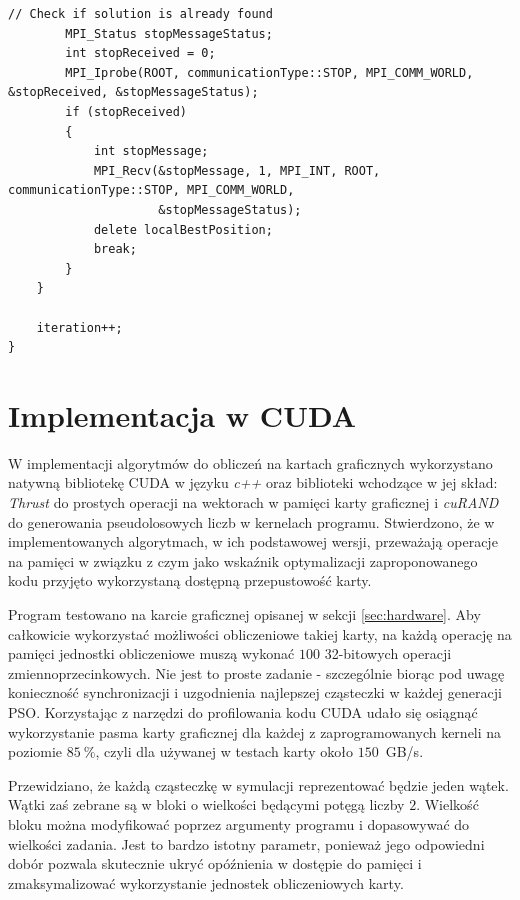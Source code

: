 \documentclass[11pt, a4paper, oneside]{article}
\begin{document}
\begin{lstlisting}[style=mycpp, label=code:pso_before, caption={Schemat komunikacji MPI w metodzie Monte Carlo.}]
        // Check if solution is already found
        MPI_Status stopMessageStatus;
        int stopReceived = 0;
        MPI_Iprobe(ROOT, communicationType::STOP, MPI_COMM_WORLD, &stopReceived, &stopMessageStatus);
        if (stopReceived)
        {
            int stopMessage;
            MPI_Recv(&stopMessage, 1, MPI_INT, ROOT, communicationType::STOP, MPI_COMM_WORLD,
                     &stopMessageStatus);
            delete localBestPosition;
            break;
        }
    }

    iteration++;
}
\end{lstlisting}
        
        
\section{Implementacja w CUDA}

W implementacji algorytmów do obliczeń na kartach graficznych wykorzystano natywną bibliotekę CUDA w języku \textit{c++} oraz biblioteki wchodzące w jej skład: \textit{Thrust} do prostych operacji na wektorach w pamięci karty graficznej i \textit{cuRAND} do generowania pseudolosowych liczb w kernelach programu. Stwierdzono, że w implementowanych algorytmach, w ich podstawowej wersji, przeważają operacje na pamięci w związku z czym jako wskaźnik optymalizacji zaproponowanego kodu przyjęto wykorzystaną dostępną przepustowość karty.

Program testowano na karcie graficznej opisanej w sekcji \ref{sec:hardware}. Aby całkowicie wykorzystać możliwości obliczeniowe takiej karty, na każdą operację na pamięci jednostki obliczeniowe muszą wykonać $100$ 32-bitowych operacji zmiennoprzecinkowych. Nie jest to proste zadanie - szczególnie biorąc pod uwagę konieczność synchronizacji i uzgodnienia najlepszej cząsteczki w każdej generacji PSO. Korzystając z narzędzi do profilowania kodu CUDA udało się osiągnąć wykorzystanie pasma karty graficznej dla każdej z zaprogramowanych kerneli na poziomie $85 \ \%$, czyli dla używanej w testach karty około $150$~GB/s.

Przewidziano, że każdą cząsteczkę w symulacji reprezentować będzie jeden wątek. Wątki zaś zebrane są w bloki o wielkości będącymi potęgą liczby $2$. Wielkość bloku można modyfikować poprzez argumenty programu i dopasowywać do wielkości zadania. Jest to bardzo istotny parametr, ponieważ jego odpowiedni dobór pozwala skutecznie ukryć opóźnienia w dostępie do pamięci i zmaksymalizować wykorzystanie jednostek obliczeniowych karty.
\end{document}
